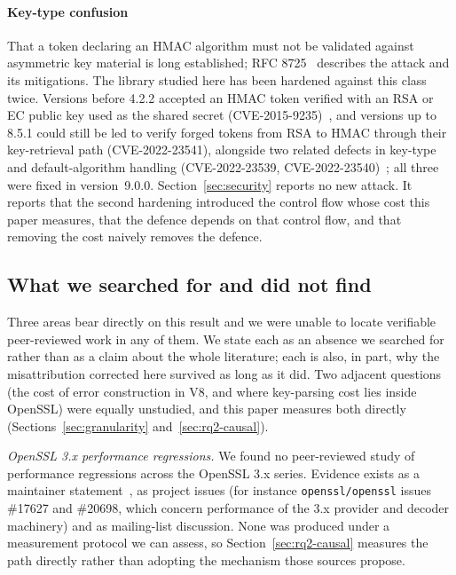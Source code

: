 \documentclass[preprint,12pt,authoryear]{elsarticle}
\begin{document}
\paragraph{Key-type confusion} That a token declaring an HMAC algorithm must
not be validated against asymmetric key material is long established; RFC
8725~\citep{rfc8725} describes the attack and its mitigations. The library
studied here has been hardened against this class twice. Versions before 4.2.2
accepted an HMAC token verified with an RSA or EC public key used as the
shared secret (CVE-2015-9235)~\citep{ghsa2015jsonwebtoken}, and versions up to
8.5.1 could still be led to verify forged tokens from RSA to HMAC through
their key-retrieval path (CVE-2022-23541), alongside two related defects in
key-type and default-algorithm handling (CVE-2022-23539,
CVE-2022-23540)~\citep{auth0bulletin2022}; all three were fixed in
version~9.0.0. Section~\ref{sec:security} reports no new attack. It reports
that the second hardening introduced the control flow whose cost this paper
measures, that the defence depends on that control flow, and that removing the
cost naively removes the defence.

\subsection*{What we searched for and did not find}

Three areas bear directly on this result and we were unable to locate
verifiable peer-reviewed work in any of them. We state each as an absence we
searched for rather than as a claim about the whole literature; each is also,
in part, why the misattribution corrected here survived as long as it did.
Two adjacent questions (the cost of error construction in V8, and where
key-parsing cost lies inside OpenSSL) were equally unstudied, and this paper
measures both directly (Sections~\ref{sec:granularity}
and~\ref{sec:rq2-causal}).

\emph{OpenSSL 3.x performance regressions.} We found no peer-reviewed study of
performance regressions across the OpenSSL 3.x series. Evidence exists as a
maintainer statement~\citep{pyca2026stateofopenssl}, as project issues (for
instance \texttt{openssl/openssl} issues \#17627 and \#20698, which concern
performance of the 3.x provider and decoder machinery) and as mailing-list
discussion. None was produced under a measurement protocol we can assess, so
Section~\ref{sec:rq2-causal} measures the path directly rather than adopting
the mechanism those sources propose.
\end{document}
